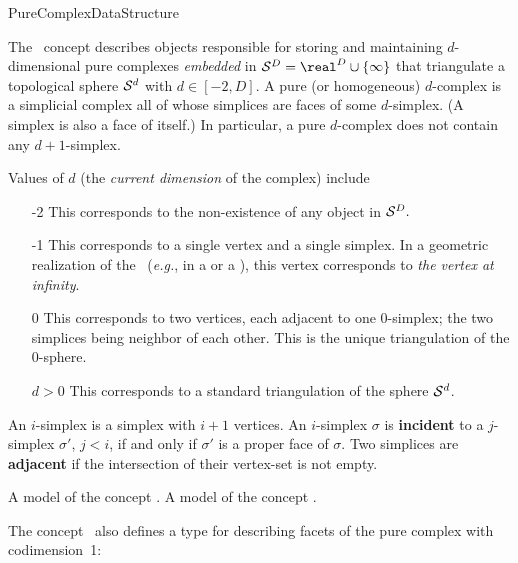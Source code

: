 \begin{ccRefConcept}{PureComplexDataStructure}

\ccDefinition

The \ccRefName\ concept describes objects responsible for storing and
maintaining $d$-dimensional pure complexes \emph{embedded} in
$\sphere^D=\real^D\cup\{\infty\}$ that triangulate a topological sphere
$\mathcal S^d$ with $d\in[-2,D]$. A pure (or homogeneous) $d$-complex is a
simplicial complex all of whose simplices are faces of some $d$-simplex. (A
simplex is also a face of itself.) In particular, a pure $d$-complex does not
contain any $d+1$-simplex.

Values of $d$ (the \emph{current dimension} of the complex) include \begin{itemize}

\item[-2] This corresponds to the non-existence of any object in
$\mathcal S^D.$

\item[-1] This corresponds to a single vertex and a single simplex. In a
geometric realization of the \ccRefName\ (\emph{e.g.}, in a
 or a
), this vertex
corresponds to \emph{the vertex at infinity}.

\item[0] This corresponds to two vertices, each adjacent to one $0$-simplex;
the two simplices being neighbor of each other. This is the unique
triangulation of the $0$-sphere.

\item[$d>0$] This corresponds to a standard triangulation of the sphere
$\mathcal S^d$.
\end{itemize}

An $i$-simplex is a simplex with $i+1$ vertices. An $i$-simplex $\sigma$ is
\textbf{incident} to a $j$-simplex $\sigma'$, $j<i$, if and only if $\sigma'$
is a proper face of $\sigma$. Two simplices are \textbf{adjacent} if the
intersection of their vertex-set is not empty.

\ccHasModels


\ccTypes

{
A model of the concept .
}
\ccGlue
{}
{
A model of the concept .
}

The concept \ccRefName\ also defines a type for describing facets of the
pure complex with codimension~1:


\end{ccRefConcept}
